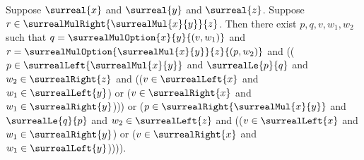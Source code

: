 \begin{proposition}\label{surreal_associative_right_nested_option}
    Suppose $\surreal{x}$ and $\surreal{y}$ and $\surreal{z}$.
    Suppose $r\in\surrealMulRight{\surrealMul{x}{y}}{z}$.
    Then there exist $p,q,v,w_1,w_2$ such that
        $q=\surrealMulOption{x}{y}{(v,w_1)}$ and
        $r=\surrealMulOption{\surrealMul{x}{y}}{z}{(p,w_2)}$ and
        (($p\in\surrealLeft{\surrealMul{x}{y}}$ and
            $\surrealLe{p}{q}$ and
            $w_2\in\surrealRight{z}$ and
            (($v\in\surrealLeft{x}$ and
                $w_1\in\surrealLeft{y}$) or
             ($v\in\surrealRight{x}$ and
                $w_1\in\surrealRight{y}$))) or
         ($p\in\surrealRight{\surrealMul{x}{y}}$ and
            $\surrealLe{q}{p}$ and
            $w_2\in\surrealLeft{z}$ and
            (($v\in\surrealLeft{x}$ and
                $w_1\in\surrealRight{y}$) or
             ($v\in\surrealRight{x}$ and
                $w_1\in\surrealLeft{y}$)))).
\end{proposition}
